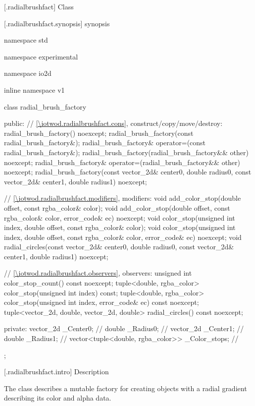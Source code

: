  [\iotwod.radialbrushfact] {Class }

 [\iotwod.radialbrushfact.synopsis] { synopsis}

\begin{codeblock}
namespace std { namespace experimental { namespace io2d { inline namespace v1 {
  class radial_brush_factory {
  public:
    // \ref{\iotwod.radialbrushfact.cons}, construct/copy/move/destroy:
    radial_brush_factory() noexcept;
    radial_brush_factory(const radial_brush_factory&);
    radial_brush_factory& operator=(const radial_brush_factory&);
    radial_brush_factory(radial_brush_factory&& other) noexcept;
    radial_brush_factory& operator=(radial_brush_factory&& other) noexcept;
    radial_brush_factory(const vector_2d& center0, double radius0,
      const vector_2d& center1, double radius1) noexcept;

    // \ref{\iotwod.radialbrushfact.modifiers}, modifiers:
    void add_color_stop(double offset, const rgba_color& color);
    void add_color_stop(double offset, const rgba_color& color,
      error_code& ec) noexcept;
    void color_stop(unsigned int index, double offset, const rgba_color& color);
    void color_stop(unsigned int index, double offset, const rgba_color& color,
      error_code& ec) noexcept;
    void radial_circles(const vector_2d& center0, double radius0,
      const vector_2d& center1, double radius1) noexcept;

    // \ref{\iotwod.radialbrushfact.observers}, observers:
    unsigned int color_stop_count() const noexcept;
    tuple<double, rgba_color> color_stop(unsigned int index) const;
    tuple<double, rgba_color> color_stop(unsigned int index,
      error_code& ec) const noexcept;
    tuple<vector_2d, double, vector_2d, double> radial_circles() const noexcept;

  private:
    vector_2d _Center0;                             // \expos
    double _Radius0;                                // \expos
    vector_2d _Center1;                             // \expos
    double _Radius1;                                // \expos
    vector<tuple<double, rgba_color>> _Color_stops; // \expos
  };
} } } }
\end{codeblock}

 [\iotwod.radialbrushfact.intro] { Description}

\pnum
{}
The class  describes a mutable factory for creating  objects with a radial gradient describing its color and alpha data.

